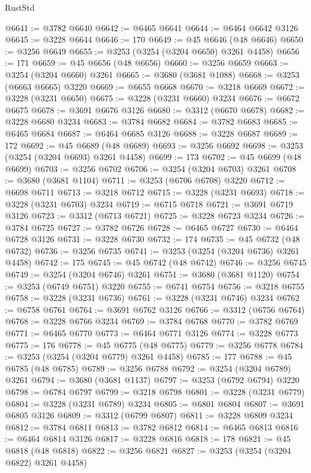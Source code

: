 \begin{lexlean}{RustStd}
\begin{coremodule}
{\begin{coremodule}
{{{{{{{{{{{{{{{{{{{{{{{{{{{{{{{{{{{{{@6641 := @3782 @6640
@6642 := @6465 @6641
@6644 := @6464 @6642 @3126
@6645 := @3228 @6644
@6646 := 170
@6649 := @45 @6646 (@48 @6646)
@6650 := @3256 @6649
@6655 := @3253 (@3254 (@3204 @6650) @3261 @4458)
@6656 := 171
@6659 := @45 @6656 (@48 @6656)
@6660 := @3256 @6659
@6663 := @3254 (@3204 @6660) @3261
@6665 := @3680 (@3681 @1088)
@6668 := @3253 (@6663 @6665) @3220
@6669 := @6655 @6668
@6670 := @3218 @6669
@6672 := @3228 (@3231 @6650)
@6675 := @3228 (@3231 @6660) @3234
@6676 := @6672 @6675
@6678 := @3691 @6676 @3126
@6680 := @3312 (@6670 @6678)
@6682 := @3228 @6680 @3234
@6683 := @3784 @6682
@6684 := @3782 @6683
@6685 := @6465 @6684
@6687 := @6464 @6685 @3126
@6688 := @3228 @6687
@6689 := 172
@6692 := @45 @6689 (@48 @6689)
@6693 := @3256 @6692
@6698 := @3253 (@3254 (@3204 @6693) @3261 @4458)
@6699 := 173
@6702 := @45 @6699 (@48 @6699)
@6703 := @3256 @6702
@6706 := @3254 (@3204 @6703) @3261
@6708 := @3680 (@3681 @1104)
@6711 := @3253 (@6706 @6708) @3220
@6712 := @6698 @6711
@6713 := @3218 @6712
@6715 := @3228 (@3231 @6693)
@6718 := @3228 (@3231 @6703) @3234
@6719 := @6715 @6718
@6721 := @3691 @6719 @3126
@6723 := @3312 (@6713 @6721)
@6725 := @3228 @6723 @3234
@6726 := @3784 @6725
@6727 := @3782 @6726
@6728 := @6465 @6727
@6730 := @6464 @6728 @3126
@6731 := @3228 @6730
@6732 := 174
@6735 := @45 @6732 (@48 @6732)
@6736 := @3256 @6735
@6741 := @3253 (@3254 (@3204 @6736) @3261 @4458)
@6742 := 175
@6745 := @45 @6742 (@48 @6742)
@6746 := @3256 @6745
@6749 := @3254 (@3204 @6746) @3261
@6751 := @3680 (@3681 @1120)
@6754 := @3253 (@6749 @6751) @3220
@6755 := @6741 @6754
@6756 := @3218 @6755
@6758 := @3228 (@3231 @6736)
@6761 := @3228 (@3231 @6746) @3234
@6762 := @6758 @6761
@6764 := @3691 @6762 @3126
@6766 := @3312 (@6756 @6764)
@6768 := @3228 @6766 @3234
@6769 := @3784 @6768
@6770 := @3782 @6769
@6771 := @6465 @6770
@6773 := @6464 @6771 @3126
@6774 := @3228 @6773
@6775 := 176
@6778 := @45 @6775 (@48 @6775)
@6779 := @3256 @6778
@6784 := @3253 (@3254 (@3204 @6779) @3261 @4458)
@6785 := 177
@6788 := @45 @6785 (@48 @6785)
@6789 := @3256 @6788
@6792 := @3254 (@3204 @6789) @3261
@6794 := @3680 (@3681 @1137)
@6797 := @3253 (@6792 @6794) @3220
@6798 := @6784 @6797
@6799 := @3218 @6798
@6801 := @3228 (@3231 @6779)
@6804 := @3228 (@3231 @6789) @3234
@6805 := @6801 @6804
@6807 := @3691 @6805 @3126
@6809 := @3312 (@6799 @6807)
@6811 := @3228 @6809 @3234
@6812 := @3784 @6811
@6813 := @3782 @6812
@6814 := @6465 @6813
@6816 := @6464 @6814 @3126
@6817 := @3228 @6816
@6818 := 178
@6821 := @45 @6818 (@48 @6818)
@6822 := @3256 @6821
@6827 := @3253 (@3254 (@3204 @6822) @3261 @4458)
}}}}}}}}}}}}}}}}}}}}}}}}}}}}}}}}}}}}}
\end{coremodule}}
\end{coremodule}
\end{lexlean}
